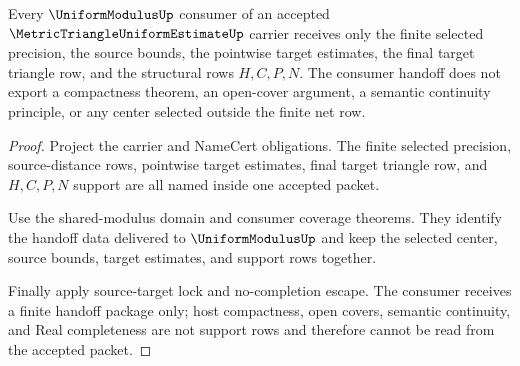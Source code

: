 \begin{theorem}
\label{thm:metric-triangle-uniform-estimate-finite-net-consumer-lock}
Every $\UniformModulusUp$ consumer of an accepted $\MetricTriangleUniformEstimateUp$ carrier receives only the finite selected precision, the source bounds, the pointwise target estimates, the final target triangle row, and the structural rows $H,C,P,N$. The consumer handoff does not export a compactness theorem, an open-cover argument, a semantic continuity principle, or any center selected outside the finite net row.
\end{theorem}
\begin{proof}
Project the carrier and NameCert obligations. The finite selected precision, source-distance rows, pointwise target estimates, final target triangle row, and $H,C,P,N$ support are all named inside one accepted packet.

Use the shared-modulus domain and consumer coverage theorems. They identify the handoff data delivered to $\UniformModulusUp$ and keep the selected center, source bounds, target estimates, and support rows together.

Finally apply source-target lock and no-completion escape. The consumer receives a finite handoff package only; host compactness, open covers, semantic continuity, and Real completeness are not support rows and therefore cannot be read from the accepted packet.
\end{proof}

